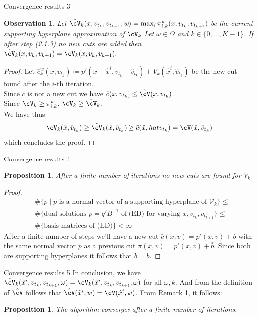 \documentclass[11pt, aspectratio=169]{beamer}
\newtheorem{prop}[theorem]{Proposition}
\newtheorem{oss}[theorem]{Observation}
\begin{document}
\begin{frame}{Convergence results 3}
\begin{oss}
  Let \( \hat{\cV}_k(x,v_{t_k},v_{t_{k+1}},w) = \max_i \pi_{i,k}^w(x,v_{t_k},v_{t_{k+1}})\) be the current supporting hyperplane approximation of \(\cV_k\)
  Let \( \omega \in \Omega \) and \(k \in \{0,\ldots,K-1\}\). If after step (2.1.3) no new cuts are added then \(\hat{\cV}_k(x, v_{k},v_{k+1}) = \cV_k(x, v_{k},v_{k+1}). \) \\
  
\end{oss}
\begin{proof}
  
  Let \(\bar c_k^w(x,v_{t_k}) \coloneqq p'(x-\hat x^i, v_{t_k}-\hat v_{t_k}) + V_k(\hat x^i,\hat v_{t_k})\) be the new cut found after the \(i\)-th iteration. \\
  Since \(\bar c\) is not a new cut we have \( \bar c(x,v_{t_k}) \leq \hat{\cV}(x,v_{t_k})\).
  \\ Since \(\cV_k \geq \pi_{i,k}^w \), \(\cV_k \geq \hat{\cV}_k \). \\
  We have thus \[\cV_k(\hat x,\hat v_{t_k}) \geq \hat \cV_k(\hat x,\hat v_{t_k}) \geq \bar c (\hat x,hat v_{t_k}) = \cV(\hat x,\hat v_{t_k})\] which concludes the proof.
\end{proof}
\end{frame}

\begin{frame}{Convergence results 4}
  \begin{prop}
    After a finite number of iterations no new cuts are found for \(V_k\)
  \end{prop}
  \begin{proof}
    \begin{align}
      &\#\{p \mid p \text{ is a normal vector of a supporting hyperplane of } \mathcal{V}_k\} \leq \nonumber \\
      &\#\{\text{dual solutions } p=q'B^{-1} \text{ of (ED) for varying } x, v_{t_k}, v_{t_{k+1}}\} \leq \nonumber \\
      &\#\{\text{basis matrices of (ED)}\} < \infty 
    \end{align}
     After a finite number of steps we'll have a new cut \(\bar c (x,v)= p'(x,v) + b\) 
    with the same normal vector \(p\) as a previous cut \(\pi(x,v) = p'(x,v) + \bar b\). Since both are supporting hyperplanes it follows that \( b = \bar b\).
  \end{proof}
\end{frame}
\begin{frame}{Convergence results 5}
  In conclusion, we have \(\hat{\cV}_k(\hat x^i, v_{t_k},v_{t_{k+1}},\omega) = \cV_k(\hat x^i, v_{t_k},v_{t_{k+1}},\omega)\) for all \(\omega,k\).
   And from the definition of \(\hat \cV\) follows that \( \hat \cV(\hat x^i,w) = \cV(\hat x^i,w) \). 
   From Remark 1, it follows:
  \begin{prop}
    The algorithm converges after a finite number of iterations.
  \end{prop}
\end{frame}
\end{document}

